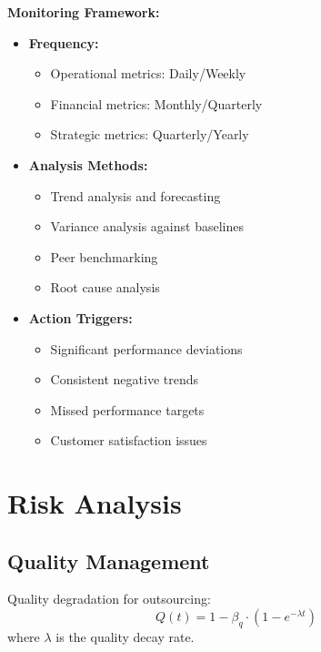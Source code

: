 \documentclass[12pt,a4paper]{article}
\newenvironment{definition}[1]
{\begin{mdframed}[style=definitionstyle,frametitle={Definition: #1}]}
{\end{mdframed}}
\newenvironment{explanation}
{\begin{mdframed}[style=explanationstyle,frametitle={Explanation}]}
{\end{mdframed}}
\begin{document}
\begin{explanation}
\textbf{Monitoring Framework:}
\begin{itemize}
    \item \textbf{Frequency:}
        \begin{itemize}
            \item Operational metrics: Daily/Weekly
            \item Financial metrics: Monthly/Quarterly
            \item Strategic metrics: Quarterly/Yearly
        \end{itemize}
    \item \textbf{Analysis Methods:}
        \begin{itemize}
            \item Trend analysis and forecasting
            \item Variance analysis against baselines
            \item Peer benchmarking
            \item Root cause analysis
        \end{itemize}
    \item \textbf{Action Triggers:}
        \begin{itemize}
            \item Significant performance deviations
            \item Consistent negative trends
            \item Missed performance targets
            \item Customer satisfaction issues
        \end{itemize}
\end{itemize}
\end{explanation}

\section{Risk Analysis}
\subsection{Quality Management}
\begin{definition}{Quality Functions}
Quality degradation for outsourcing:
\begin{equation}
    Q(t) = 1 - \beta_q \cdot (1 - e^{-\lambda t})
\end{equation}
where $\lambda$ is the quality decay rate.
\end{definition}
\end{document}
